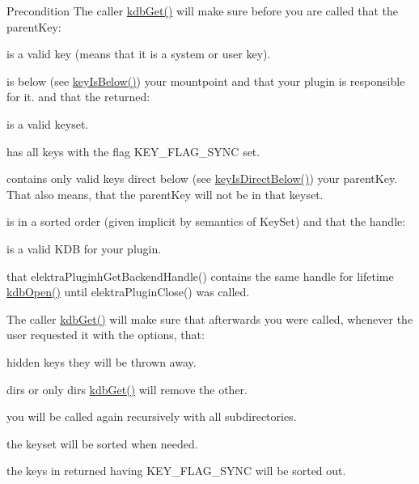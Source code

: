 \begin{DoxyPrecond}{Precondition}
The caller \hyperlink{group__kdb_ga28e385fd9cb7ccfe0b2f1ed2f62453a1}{kdb\-Get()} will make sure before you are called that the parent\-Key\-:
\begin{DoxyItemize}
\item is a valid key (means that it is a system or user key).
\item is below (see \hyperlink{group__keytest_ga03332b5d97c76a4fd2640aca4762b8df}{key\-Is\-Below()}) your mountpoint and that your plugin is responsible for it. and that the returned\-:
\item is a valid keyset.
\item has {\ttfamily all} keys with the flag K\-E\-Y\-\_\-\-F\-L\-A\-G\-\_\-\-S\-Y\-N\-C set.
\item contains only valid keys direct below (see \hyperlink{group__keytest_ga4f175aafd98948ce6c774f3bd92b72ca}{key\-Is\-Direct\-Below()}) your parent\-Key. That also means, that the parent\-Key will not be in that keyset.
\item is in a sorted order (given implicit by semantics of Key\-Set) and that the handle\-:
\begin{DoxyItemize}
\item is a valid K\-D\-B for your plugin.
\item that elektra\-Pluginh\-Get\-Backend\-Handle() contains the same handle for lifetime \hyperlink{group__kdb_ga6808defe5870f328dd17910aacbdc6ca}{kdb\-Open()} until elektra\-Plugin\-Close() was called.
\end{DoxyItemize}
\end{DoxyItemize}

The caller \hyperlink{group__kdb_ga28e385fd9cb7ccfe0b2f1ed2f62453a1}{kdb\-Get()} will make sure that afterwards you were called, whenever the user requested it with the options, that\-:
\begin{DoxyItemize}
\item hidden keys they will be thrown away.
\item dirs or only dirs \hyperlink{group__kdb_ga28e385fd9cb7ccfe0b2f1ed2f62453a1}{kdb\-Get()} will remove the other.
\item you will be called again recursively with all subdirectories.
\item the keyset will be sorted when needed.
\item the keys in returned having K\-E\-Y\-\_\-\-F\-L\-A\-G\-\_\-\-S\-Y\-N\-C will be sorted out.
\end{DoxyItemize}
\end{DoxyPrecond}
